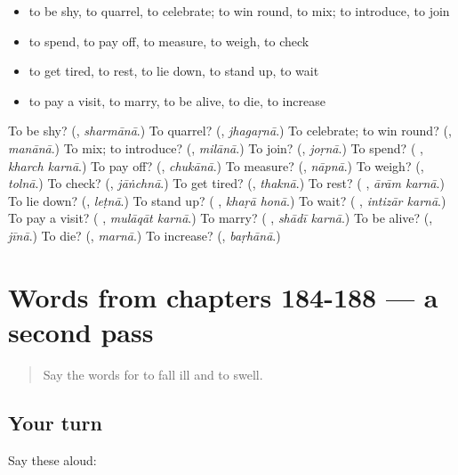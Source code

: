 \begin{itemize}
\raggedright
  \item to be shy, to quarrel, to celebrate; to win round, to mix; to introduce, to join
  \item to spend, to pay off, to measure, to weigh, to check
  \item to get tired, to rest, to lie down, to stand up, to wait
  \item to pay a visit, to marry, to be alive, to die, to increase
\end{itemize}

\begin{tcolorbox}[breakable,colback=teal!4,colframe=teal!35!black,title={Before you move on}]
To be shy? (\textbf{}, \emph{sharmānā}.) To quarrel? (\textbf{}, \emph{jhagaṛnā}.) To celebrate; to win round? (\textbf{}, \emph{manānā}.) To mix; to introduce? (\textbf{}, \emph{milānā}.) To join? (\textbf{}, \emph{joṛnā}.) To spend? (\textbf{ }, \emph{kharch karnā}.) To pay off? (\textbf{}, \emph{chukānā}.) To measure? (\textbf{}, \emph{nāpnā}.) To weigh? (\textbf{}, \emph{tolnā}.) To check? (\textbf{}, \emph{jāṅchnā}.) To get tired? (\textbf{}, \emph{thaknā}.) To rest? (\textbf{ }, \emph{ārām karnā}.) To lie down? (\textbf{}, \emph{leṭnā}.) To stand up? (\textbf{ }, \emph{khaṛā honā}.) To wait? (\textbf{ }, \emph{intizār karnā}.) To pay a visit? (\textbf{ }, \emph{mulāqāt karnā}.) To marry? (\textbf{ }, \emph{shādī karnā}.) To be alive? (\textbf{}, \emph{jīnā}.) To die? (\textbf{}, \emph{marnā}.) To increase? (\textbf{}, \emph{baṛhānā}.)
\end{tcolorbox}
\section[(dialogue)]{Words from chapters 184-188 — a second pass}

\label{lesson:UR-R188-second-pass-words-from-chapters-184-188}



\begin{quote}
Say the words for to fall ill and to swell.
\end{quote}

\subsection*{Your turn}
Say these aloud:

